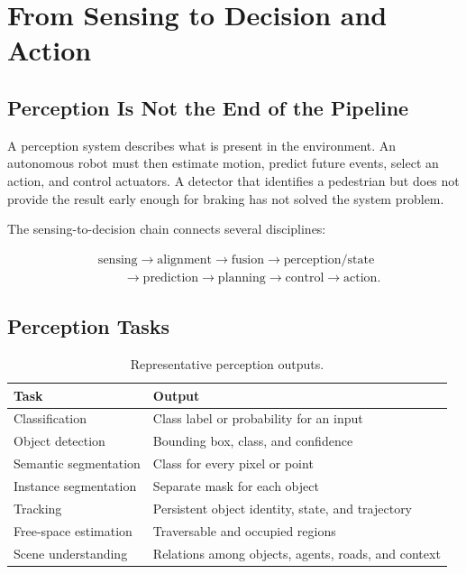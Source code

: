 \chapter{From Sensing to Decision and Action}
\label{chap:sensing-decision}

\section{Perception Is Not the End of the Pipeline}

A perception system describes what is present in the environment. An autonomous robot must then estimate motion, predict future events, select an action, and control actuators. A detector that identifies a pedestrian but does not provide the result early enough for braking has not solved the system problem.

The sensing-to-decision chain connects several disciplines:

\[
\begin{aligned}
&\text{sensing} \rightarrow \text{alignment} \rightarrow \text{fusion} \rightarrow \text{perception/state} \\
&\qquad \rightarrow \text{prediction} \rightarrow \text{planning} \rightarrow \text{control} \rightarrow \text{action}.
\end{aligned}
\]

\section{Perception Tasks}

\begin{table}[H]
\centering
\caption{Representative perception outputs.}
\label{tab:perception-tasks}
\begin{tabularx}{\textwidth}{@{}p{3.3cm}X@{}}
\toprule
\textbf{Task} & \textbf{Output} \\
\midrule
Classification & Class label or probability for an input \\
Object detection & Bounding box, class, and confidence \\
Semantic segmentation & Class for every pixel or point \\
Instance segmentation & Separate mask for each object \\
Tracking & Persistent object identity, state, and trajectory \\
Free-space estimation & Traversable and occupied regions \\
Scene understanding & Relations among objects, agents, roads, and context \\
\bottomrule
\end{tabularx}
\end{table}

